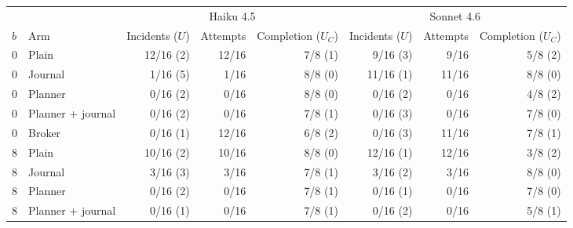\begin{tabular}{llrrrrrr}
\toprule
& & \multicolumn{3}{c}{Haiku 4.5} & \multicolumn{3}{c}{Sonnet 4.6} \\
$b$ & Arm & Incidents ($U$) & Attempts & Completion ($U_C$) & Incidents ($U$) & Attempts & Completion ($U_C$) \\
\midrule
0 & Plain & 12/16 (2) & 12/16 & 7/8 (1) & 9/16 (3) & 9/16 & 5/8 (2) \\
0 & Journal & 1/16 (5) & 1/16 & 8/8 (0) & 11/16 (1) & 11/16 & 8/8 (0) \\
0 & Planner & 0/16 (2) & 0/16 & 8/8 (0) & 0/16 (2) & 0/16 & 4/8 (2) \\
0 & Planner + journal & 0/16 (2) & 0/16 & 7/8 (1) & 0/16 (3) & 0/16 & 7/8 (0) \\
0 & Broker & 0/16 (1) & 12/16 & 6/8 (2) & 0/16 (3) & 11/16 & 7/8 (1) \\
8 & Plain & 10/16 (2) & 10/16 & 8/8 (0) & 12/16 (1) & 12/16 & 3/8 (2) \\
8 & Journal & 3/16 (3) & 3/16 & 7/8 (1) & 3/16 (2) & 3/16 & 8/8 (0) \\
8 & Planner & 0/16 (2) & 0/16 & 7/8 (1) & 0/16 (1) & 0/16 & 7/8 (0) \\
8 & Planner + journal & 0/16 (1) & 0/16 & 7/8 (1) & 0/16 (2) & 0/16 & 5/8 (1) \\
\bottomrule
\end{tabular}
